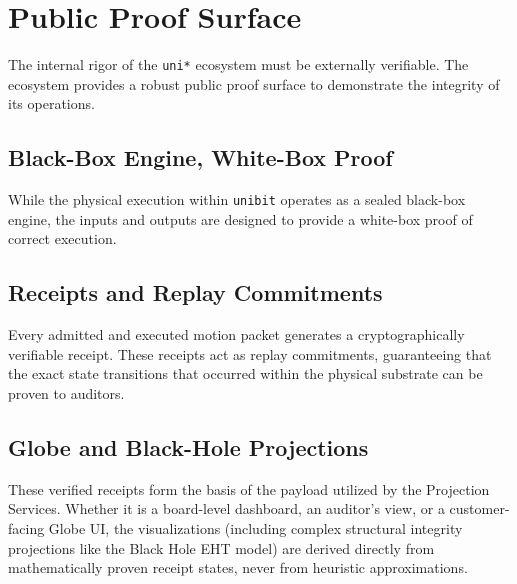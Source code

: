 \chapter{Public Proof Surface}

The internal rigor of the \texttt{uni*} ecosystem must be externally verifiable. The ecosystem provides a robust public proof surface to demonstrate the integrity of its operations.

\section{Black-Box Engine, White-Box Proof}

While the physical execution within \texttt{unibit} operates as a sealed black-box engine, the inputs and outputs are designed to provide a white-box proof of correct execution.

\section{Receipts and Replay Commitments}

Every admitted and executed motion packet generates a cryptographically verifiable receipt. These receipts act as replay commitments, guaranteeing that the exact state transitions that occurred within the physical substrate can be proven to auditors.

\section{Globe and Black-Hole Projections}

These verified receipts form the basis of the payload utilized by the Projection Services. Whether it is a board-level dashboard, an auditor's view, or a customer-facing Globe UI, the visualizations (including complex structural integrity projections like the Black Hole EHT model) are derived directly from mathematically proven receipt states, never from heuristic approximations.